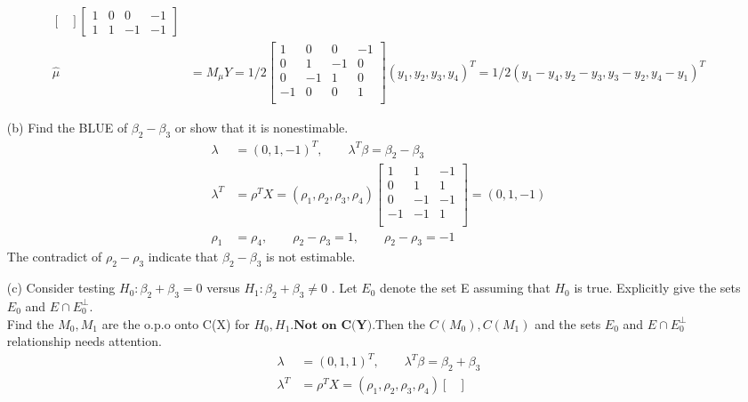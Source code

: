 \documentclass{article}
\begin{document}
\begin{itemize}
\begin{align*}
\begin{bmatrix}
         \end{bmatrix}\begin{bmatrix}
           1 & 0 & 0 & -1    \\
           1 & 1 & -1 & -1
         \end{bmatrix}\\
       \hat{\mu} &= M_{\mu} Y =  1/2 \begin{bmatrix}
           1  & 0 & 0 & -1   \\
           0 &  1 & -1 & 0 \\
           0  & -1 & 1 & 0 \\
           -1 &  0 & 0 & 1 \\
         \end{bmatrix} (y_1, y_2, y_3, y_4)^T = 1/2 (y_1- y_4, y_2-y_3, y_3-y_2, y_4-y_1)^T
\end{align*}
\item[(b)] Find the BLUE of $\beta_2 - \beta_3$ or show that it is nonestimable.
\begin{align*}
    \lambda &= (0, 1,-1)^T, \qquad \lambda^T \beta = \beta_2 - \beta_3\\
    \lambda^T &= \rho^T X = (\rho_1, \rho_2, \rho_3, \rho_4)  \begin{bmatrix}
           1  & 1 & -1  \\
           0 &  1 & 1\\
           0  & -1 & -1  \\
           -1 &  -1 & 1\\
         \end{bmatrix} = (0, 1,-1)\\
         \rho_1 &= \rho_4, \qquad \rho_2 - \rho_3 = 1, \qquad \rho_2 - \rho_3 = -1
\end{align*}
The contradict of $\rho_2 - \rho_3$ indicate that  $\beta_2 - \beta_3$ is not estimable.
\item[(c)] Consider testing $H_0: \beta_2 + \beta_3 = 0$  versus $H_1: \beta_2 + \beta_3 \neq 0$ . Let $E_0$ denote the set E assuming that $H_0$ is true. Explicitly give the sets $E_0$ and $E \cap E_0^{\perp}$.\\
Find the $M_{0}, M_{1}$ are the o.p.o onto C(X) for $H_0, H_1$.$\textbf{Not on C(Y)}$.Then the $C(M_{0}), C(M_{1})$ and the sets $E_0$ and $E \cap E_0^{\perp}$ relationship needs attention.
\begin{align*}
    \lambda &= (0, 1, 1)^T, \qquad \lambda^T \beta = \beta_2 + \beta_3\\
    \lambda^T &= \rho^T X = (\rho_1, \rho_2, \rho_3, \rho_4)  \begin{bmatrix}

\end{bmatrix}
\end{align*}
\end{itemize}
\end{document}
